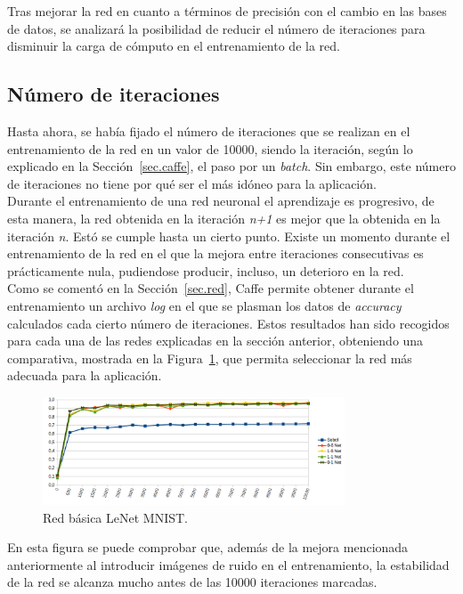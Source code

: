 Tras mejorar la red en cuanto a términos de precisión con el cambio en las bases de datos, se analizará la posibilidad de reducir el número de iteraciones para disminuir la carga de cómputo en el entrenamiento de la red.
\subsection{Número de iteraciones}
Hasta ahora, se había fijado el número de iteraciones que se realizan en el entrenamiento de la red en un valor de 10000, siendo la iteración, según lo explicado en la Sección~\ref{sec.caffe}, el paso por un \textit{batch}. Sin embargo, este número de iteraciones no tiene por qué ser el más idóneo para la aplicación.\\

Durante el entrenamiento de una red neuronal el aprendizaje es progresivo, de esta manera, la red obtenida en la iteración \textit{n+1} es mejor que la obtenida en la iteración \textit{n}. Estó se cumple hasta un cierto punto. Existe un momento durante el entrenamiento de la red en el que la mejora entre iteraciones consecutivas es prácticamente nula, pudiendose producir, incluso, un deterioro en la red.\\

Como se comentó en la Sección~\ref{sec.red}, Caffe permite obtener durante el entrenamiento un archivo \textit{log} en el que se plasman los datos de \textit{accuracy} calculados cada cierto número de iteraciones. Estos resultados han sido recogidos para cada una de las redes explicadas en la sección anterior, obteniendo una comparativa, mostrada en la Figura~\ref{fig.iteraciones}, que permita seleccionar la red más adecuada para la aplicación.
\begin{figure}[H]
	\begin{center}
		\includegraphics[width=0.8\textwidth]{figures/iteraciones}
		\caption{Red básica LeNet MNIST.}
		\label{fig.iteraciones}
	\end{center}
\end{figure}
En esta figura se puede comprobar que, además de la mejora mencionada anteriormente al introducir imágenes de ruido en el entrenamiento, la estabilidad de la red se alcanza mucho antes de las 10000 iteraciones marcadas.\\

